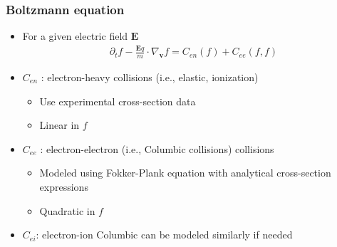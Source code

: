 \documentclass[mathserif, aspectratio=169]{beamer}
\newcommand{\vect}[1]{\boldsymbol{#1}}
\newcommand{\myint}{\int\limits}
\newcommand{\diff}[1]{\, d#1}
\begin{document}
\begin{frame}
	\frametitle{Boltzmann equation}
	\begin{itemize}
		\item For a given electric field $\vect{E}$
		\begin{align}
			\partial_t f -\frac{\vect{E} q}{m} \cdot \nabla_{\vect{v }}f = C_{en}(f) + C_{ee}(f,f)
		\end{align}
		\item $C_{en}$ : electron-heavy collisions (i.e., elastic, ionization)
		\begin{itemize}
			\item Use experimental cross-section data 
			\item Linear in $f$
		\end{itemize} 
		\item $C_{ee}$ : electron-electron (i.e., Columbic collisions) collisions 
		\begin{itemize}
			\item Modeled using Fokker-Plank equation with analytical cross-section expressions
			\item Quadratic in $f$
		\end{itemize}
		\item $C_{ei}$: electron-ion Columbic can be modeled similarly if needed
	\end{itemize}
\end{frame}
\end{document}
